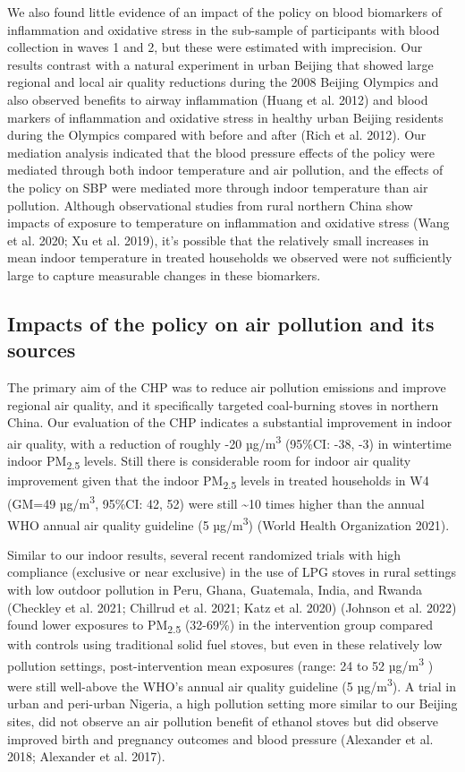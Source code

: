 \documentclass[
  letterpaper,
  DIV=11,
  numbers=noendperiod]{scrartcl}
\begin{document}
We also found little evidence of an impact of the policy on blood
biomarkers of inflammation and oxidative stress in the sub-sample of
participants with blood collection in waves 1 and 2, but these were
estimated with imprecision. Our results contrast with a natural
experiment in urban Beijing that showed large regional and local air
quality reductions during the 2008 Beijing Olympics and also observed
benefits to airway inflammation (Huang et al. 2012) and blood markers of
inflammation and oxidative stress in healthy urban Beijing residents
during the Olympics compared with before and after (Rich et al. 2012).
Our mediation analysis indicated that the blood pressure
effects of the policy were mediated through both indoor temperature and
air pollution, and the effects of the policy on SBP were mediated more
through indoor temperature than air pollution. Although observational
studies from rural northern China show impacts of exposure to
temperature on inflammation and oxidative stress (Wang et al. 2020; Xu
et al. 2019), it's possible that the relatively small increases in mean
indoor temperature in treated households we observed were not
sufficiently large to capture measurable changes in these biomarkers.

\subsection{Impacts of the policy on air pollution and its
sources}\label{impacts-of-the-policy-on-air-pollution-and-its-sources}

The primary aim of the CHP was to reduce air pollution emissions and
improve regional air quality, and it specifically targeted coal-burning
stoves in northern China. Our evaluation of the CHP indicates a
substantial improvement in indoor air quality, with a reduction of
roughly -20 µg/m\textsuperscript{3} (95\%CI: -38, -3) in wintertime
indoor PM\textsubscript{2.5} levels. Still there is considerable room
for indoor air quality improvement given that the indoor
PM\textsubscript{2.5} levels in treated households in W4 (GM=49
µg/m\textsuperscript{3}, 95\%CI: 42, 52) were still \textasciitilde10
times higher than the annual WHO annual air quality guideline (5
µg/m\textsuperscript{3}) (World Health Organization 2021).

Similar to our indoor results, several recent randomized trials with
high compliance (exclusive or near exclusive) in the use of LPG stoves
in rural settings with low outdoor pollution in Peru, Ghana, Guatemala,
India, and Rwanda (Checkley et al. 2021; Chillrud et al. 2021; Katz et
al. 2020) (Johnson et al. 2022) found lower exposures to
PM\textsubscript{2.5} (32-69\%) in the intervention group compared with
controls using traditional solid fuel stoves, but even in these
relatively low pollution settings, post-intervention mean exposures
(range: 24 to 52 µg/m\textsuperscript{3} ) were still well-above the
WHO's annual air quality guideline (5 µg/m\textsuperscript{3}). A trial
in urban and peri-urban Nigeria, a high pollution setting more similar
to our Beijing sites, did not observe an air pollution benefit of
ethanol stoves but did observe improved birth and pregnancy outcomes and
blood pressure (Alexander et al. 2018; Alexander et al. 2017).
\end{document}
